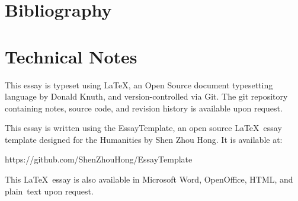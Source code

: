 \section*{Bibliography}
\nocite{*}
\printbibliography[heading=none]

\section*{Technical Notes}
This essay is typeset using \LaTeX, an Open Source document typesetting language
by Donald Knuth, and version-controlled via Git. The git repository containing notes, source code, and revision history is available upon request.


\noindent
This essay is written using the EssayTemplate, an open source \LaTeX\ essay
template designed for the Humanities by Shen Zhou Hong. It is available at:

https://github.com/ShenZhouHong/EssayTemplate

\vfill
\begin{center}
This \LaTeX\ essay is also available in Microsoft Word, OpenOffice, HTML, and \mbox{plain text} upon request.
\end{center}
